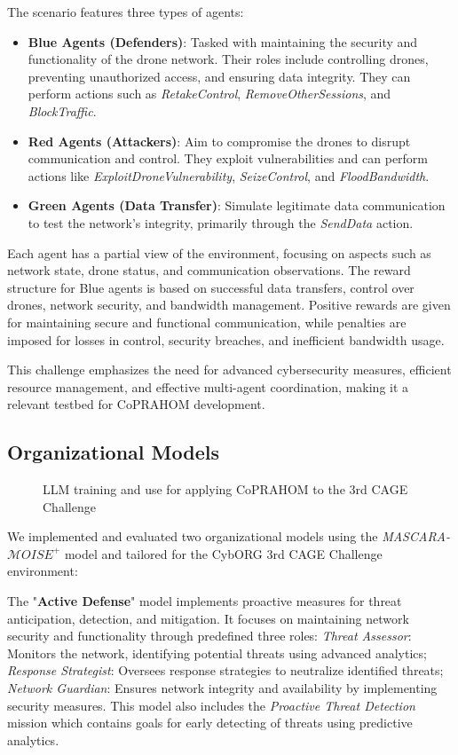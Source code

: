 The scenario features three types of agents:
\begin{itemize}
    \item \textbf{Blue Agents (Defenders)}: Tasked with maintaining the security and functionality of the drone network. Their roles include controlling drones, preventing unauthorized access, and ensuring data integrity. They can perform actions such as \textit{RetakeControl}, \textit{RemoveOtherSessions}, and \textit{BlockTraffic}.
    \item \textbf{Red Agents (Attackers)}: Aim to compromise the drones to disrupt communication and control. They exploit vulnerabilities and can perform actions like \textit{ExploitDroneVulnerability}, \textit{SeizeControl}, and \textit{FloodBandwidth}.
    \item \textbf{Green Agents (Data Transfer)}: Simulate legitimate data communication to test the network's integrity, primarily through the \textit{SendData} action.
\end{itemize}

Each agent has a partial view of the environment, focusing on aspects such as network state, drone status, and communication observations. The reward structure for Blue agents is based on successful data transfers, control over drones, network security, and bandwidth management. Positive rewards are given for maintaining secure and functional communication, while penalties are imposed for losses in control, security breaches, and inefficient bandwidth usage.

This challenge emphasizes the need for advanced cybersecurity measures, efficient resource management, and effective multi-agent coordination, making it a relevant testbed for CoPRAHOM development.

\subsection{Organizational Models}

\begin{figure}[h!]
    \centering
    
    \caption{LLM training and use for applying CoPRAHOM to the 3rd CAGE Challenge}\label{fig:llm_process}
\end{figure}


We implemented and evaluated two organizational models using the \textit{MASCARA-$\mathcal{M}OISE^+$} model and tailored for the CybORG 3rd CAGE Challenge environment:

The "\textbf{Active Defense}" model implements proactive measures for threat anticipation, detection, and mitigation. It focuses on maintaining network security and functionality through predefined three roles:
%
\textit{Threat Assessor}: Monitors the network, identifying potential threats using advanced analytics;
\textit{Response Strategist}: Oversees response strategies to neutralize identified threats;
\textit{Network Guardian}: Ensures network integrity and availability by implementing security measures.
%
This model also includes the \textit{Proactive Threat Detection} mission which contains goals for early detecting of threats using predictive analytics.

